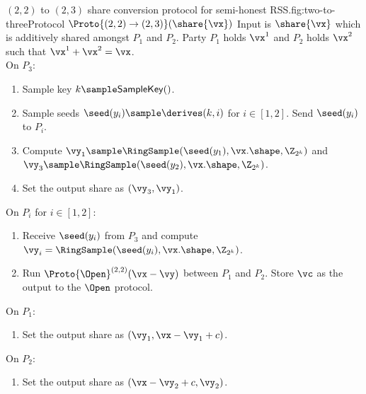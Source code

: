 
\begin{Boxfig}{$(2,2)$ to $(2,3)$ share conversion protocol for semi-honest
RSS.}{fig:two-to-three}{Protocol $\Proto{(2,2) \rightarrow (2,3)}(\share{\vx})$}
Input is $\share{\vx}$ which is additively shared amongst $P_1$ and $P_2$.
Party $P_1$ holds $\vx^1$ and $P_2$ holds $\vx^2$ such that $\vx^1 + \vx^2 = \vx$. \\
On $P_3$:
\begin{enumerate}
  \item Sample key $k \sample \mathsf{SampleKey}()$.
  \item Sample seeds $\seed(y_i) \sample \derives(k, i)$ for $i \in [1, 2]$. Send $\seed(y_i)$ to $P_i$.
  \item Compute $\vy_1 \sample \RingSample(\seed(y_1), \vx.\shape, \Z_{2^k})$
  and $\vy_3 \sample \RingSample(\seed(y_2), \vx.\shape, \Z_{2^k})$.
  \item Set
  the output share as $(\vy_3, \vy_1)$.
\end{enumerate}

On $P_i$ for $i \in [1,2]$:
\begin{enumerate}
   \item Receive $\seed(y_i)$ from $P_3$ and compute $\vy_i = \RingSample(\seed(y_i), \vx.\shape, \Z_{2^k})$.
   \item Run $\Proto{\Open}^{(2,2)}(\vx - \vy)$ between $P_1$ and $P_2$. Store $\vc$ as the output
   to the $\Open$ protocol.
\end{enumerate}

On $P_1$:
\begin{enumerate}
  \item Set the output share as $(\vy_1, \vx - \vy_1 + c)$.
\end{enumerate}
On $P_2$:
\begin{enumerate}
  \item Set the output share as $(\vx - \vy_2 + c, \vy_2)$.
\end{enumerate}
\end{Boxfig}

